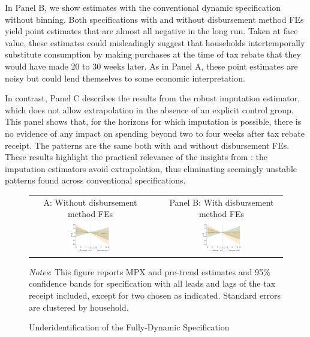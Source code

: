 \documentclass[english,11pt]{article}
\providecommand{\tabularnewline}{\\}
\theoremstyle{plain}
\theoremstyle{plain}
\theoremstyle{plain}
\theoremstyle{plain}
\let\ref\Cref
\begin{document}
In Panel B, we show estimates with the conventional dynamic specification
without binning. Both specifications with and without disbursement
method FEs yield point estimates that are almost all negative in the
long run. Taken at face value, these estimates could misleadingly
suggest that households intertemporally substitute consumption by
making purchases at the time of tax rebate that they would have made
20 to 30 weeks later. As in Panel A, these point estimates are noisy
but could lend themselves to some economic interpretation.

In contrast, Panel C describes the results from the robust imputation
estimator, which does not allow extrapolation in the absence of an
explicit control group. This panel shows that, for the horizons for
which imputation is possible, there is no evidence of any impact on
spending beyond two to four weeks after tax rebate receipt. The patterns
are the same both with and without disbursement FEs. These results
highlight the practical relevance of the insights from \ref{subsec:Spurious}:
the imputation estimators avoid extrapolation, thus eliminating seemingly
unstable patterns found across conventional specifications.

\begin{figure}
\caption{Underidentification of the Fully-Dynamic Specification\label{fig:OLS underidentification}}

\begin{centering}
\medskip{}
\par\end{centering}
\begin{centering}
\begin{tabular}{ccc}
A: Without disbursement method FEs &  & Panel B: With disbursement method FEs\tabularnewline
\includegraphics[width=0.35\textwidth]{Graphs/Figure5_A} &  & \includegraphics[width=0.35\textwidth]{Graphs/Figure5_B}\tabularnewline
\end{tabular}
\par\end{centering}
\emph{\footnotesize{}Notes}{\footnotesize{}: This figure reports MPX
and pre-trend estimates and 95\% confidence bands for specification
\ref{eq:BP_spec} with all leads and lags of the tax receipt included,
except for two chosen as indicated. Standard errors are clustered
by household.}{\footnotesize\par}
\end{figure}
\end{document}
